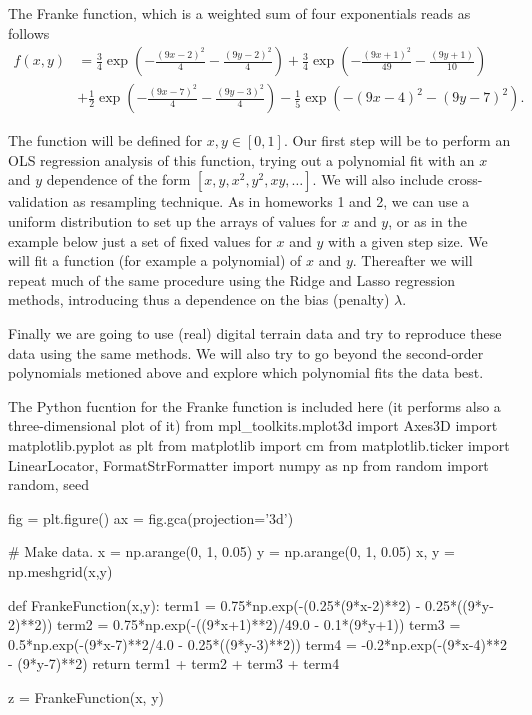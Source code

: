 \documentclass[%
oneside,                 %
final,                   %
10pt]{article}
\begin{document}
The Franke function, which is a weighted sum of four exponentials  reads as follows
\begin{align*}
f(x,y) &= \frac{3}{4}\exp{\left(-\frac{(9x-2)^2}{4} - \frac{(9y-2)^2}{4}\right)}+\frac{3}{4}\exp{\left(-\frac{(9x+1)^2}{49}- \frac{(9y+1)}{10}\right)} \\
&+\frac{1}{2}\exp{\left(-\frac{(9x-7)^2}{4} - \frac{(9y-3)^2}{4}\right)} -\frac{1}{5}\exp{\left(-(9x-4)^2 - (9y-7)^2\right) }.
\end{align*}

The function will be defined for $x,y\in [0,1]$.  Our first step will
be to perform an OLS regression analysis of this function, trying out
a polynomial fit with an $x$ and $y$ dependence of the form $[x, y,
x^2, y^2, xy, \dots]$. We will also include cross-validation as
resampling technique.  As in homeworks 1 and 2, we can use a uniform
distribution to set up the arrays of values for $x$ and $y$, or as in
the example below just a set of fixed 
values for $x$ and $y$ with a given step
size.  We will fit a
function (for example a polynomial) of $x$ and $y$.  Thereafter we
will repeat much of the same procedure using the Ridge and Lasso
regression methods, introducing thus a dependence on the bias
(penalty) $\lambda$.

Finally we are going to use (real) digital terrain data and try to
reproduce these data using the same methods. We will also try to go
beyond the second-order polynomials metioned above and explore 
which polynomial fits the data best.


The Python fucntion for the Franke function is included here (it performs also a three-dimensional plot of it)
\bpycod
from mpl_toolkits.mplot3d import Axes3D
import matplotlib.pyplot as plt
from matplotlib import cm
from matplotlib.ticker import LinearLocator, FormatStrFormatter
import numpy as np
from random import random, seed

fig = plt.figure()
ax = fig.gca(projection='3d')

# Make data.
x = np.arange(0, 1, 0.05)
y = np.arange(0, 1, 0.05)
x, y = np.meshgrid(x,y)


def FrankeFunction(x,y):
    term1 = 0.75*np.exp(-(0.25*(9*x-2)**2) - 0.25*((9*y-2)**2))
    term2 = 0.75*np.exp(-((9*x+1)**2)/49.0 - 0.1*(9*y+1))
    term3 = 0.5*np.exp(-(9*x-7)**2/4.0 - 0.25*((9*y-3)**2))
    term4 = -0.2*np.exp(-(9*x-4)**2 - (9*y-7)**2)
    return term1 + term2 + term3 + term4


z = FrankeFunction(x, y)
\end{document}
